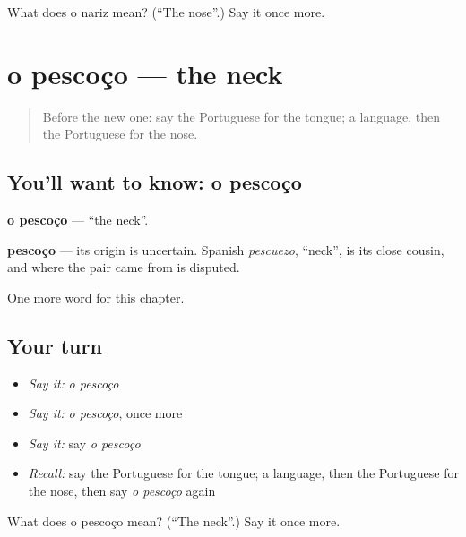 \begin{tcolorbox}[breakable,colback=teal!4,colframe=teal!35!black,title={Before you move on}]
What does o nariz mean? (\textquotedblleft{}The nose\textquotedblright{}.) Say it once more.
\end{tcolorbox}
\section[o pescoço]{o pescoço — the neck}

\label{lesson:PT-C31-pescoco}



\begin{quote}
Before the new one: say the Portuguese for the tongue; a language, then the Portuguese for the nose.
\end{quote}

\subsection*{You'll want to know: o pescoço}
\textbf{o pescoço} — \textquotedblleft{}the neck\textquotedblright{}.

\begin{cousinweb}
\textbf{pescoço} — its origin is uncertain. Spanish \emph{pescuezo}, \textquotedblleft{}neck\textquotedblright{}, is its close cousin, and where the pair came from is disputed.
\end{cousinweb}

\begin{grammarlens}[title={What you've built}]
One more word for this chapter.
\end{grammarlens}

\subsection*{Your turn}
\begin{itemize}
\raggedright
  \item \emph{Say it:} \emph{o pescoço}
  \item \emph{Say it:} \emph{o pescoço}, once more
  \item \emph{Say it:} say \emph{o pescoço}
  \item \emph{Recall:} say the Portuguese for the tongue; a language, then the Portuguese for the nose, then say \emph{o pescoço} again
\end{itemize}

\begin{tcolorbox}[breakable,colback=teal!4,colframe=teal!35!black,title={Before you move on}]
What does o pescoço mean? (\textquotedblleft{}The neck\textquotedblright{}.) Say it once more.
\end{tcolorbox}
